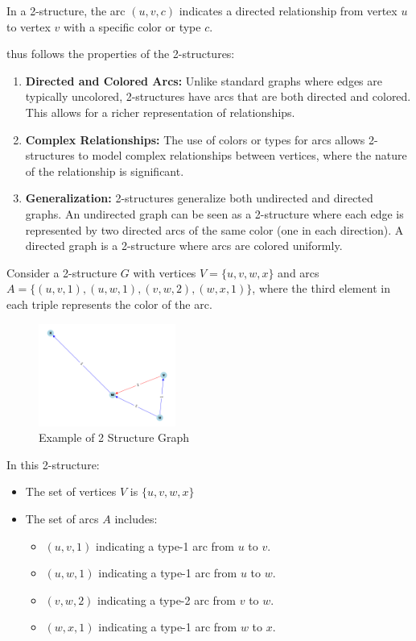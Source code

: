 In a 2-structure, the arc $(u, v, c)$ indicates a directed relationship from vertex $u$ to vertex $v$ with a specific color or type $c$.

thus follows the properties of the 2-structures:

\begin{enumerate}
    \item \textbf{Directed and Colored Arcs:} Unlike standard graphs where edges are typically uncolored, 2-structures have arcs that are both directed and colored.
    This allows for a richer representation of relationships.
    \item \textbf{Complex Relationships:} The use of colors or types for arcs allows 2-structures to model complex relationships between vertices, where the nature of the relationship is significant.
    \item \textbf{Generalization:} 2-structures generalize both undirected and directed graphs.
    An undirected graph can be seen as a 2-structure where each edge is represented by two directed arcs of the same color (one in each direction).
    A directed graph is a 2-structure where arcs are colored uniformly.
\end{enumerate}

\begin{myex}[2-Structure]
    Consider a 2-structure $G$ with vertices $V = \{u, v, w, x\}$ and arcs $A = \{(u, v, 1), (u, w, 1), (v, w, 2), (w, x, 1)\}$, where the third element in each triple represents the color of the arc.

    \begin{figure}[!h]
        \centering
        \includegraphics[width=0.40\textwidth]{images/graphs/2_structure_graph_example}
        \caption{Example of 2 Structure Graph}
        \label{fig:2-structure-graph-example-simple}
    \end{figure}

    In this 2-structure:
    \begin{itemize}
        \item The set of vertices $V$ is $\{u, v, w, x\}$
        \item The set of arcs $A$ includes:
        \begin{itemize}
            \item $(u, v, 1)$ indicating a type-1 arc from $u$ to $v$.
            \item $(u, w, 1)$ indicating a type-1 arc from $u$ to $w$.
            \item $(v, w, 2)$ indicating a type-2 arc from $v$ to $w$.
            \item $(w, x, 1)$ indicating a type-1 arc from $w$ to $x$.
        \end{itemize}
    \end{itemize}
\end{myex}

